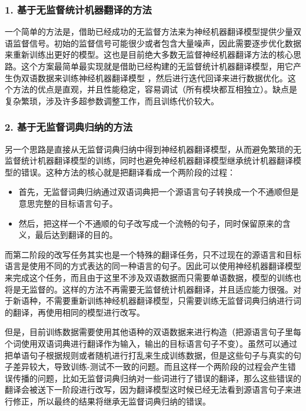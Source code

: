 \subsubsection{1. 基于无监督统计机器翻译的方法}

\parinterval 一个简单的方法是，借助已经成功的无监督方法来为神经机器翻译模型提供少量双语监督信号。初始的监督信号可能很少或者包含大量噪声，因此需要逐步优化数据来重新训练出更好的模型。这也是目前绝大多数无监督神经机器翻译方法的核心思路。这个方案最简单最实现就是借助已经构建的无监督统计机器翻译模型，用它产生伪双语数据来训练神经机器翻译模型 ，然后进行迭代回译来进行数据优化。这个方法的优点是直观，并且性能稳定，容易调试（所有模块都互相独立）。缺点是复杂繁琐，涉及许多超参数调整工作，而且训练代价较大。

\subsubsection{2. 基于无监督词典归纳的方法}

\parinterval 另一个思路是直接从无监督词典归纳中得到神经机器翻译模型，从而避免繁琐的无监督统计机器翻译模型的训练，同时也避免神经机器翻译模型继承统计机器翻译模型的错误。这种方法的核心就是把翻译看成一个两阶段的过程：

\begin{itemize}
\vspace{0.5em}
\item 首先，无监督词典归纳通过双语词典把一个源语言句子转换成一个不通顺但是意思完整的目标语言句子。
\vspace{0.5em}
\item 然后，把这样一个不通顺的句子改写成一个流畅的句子，同时保留原来的含义，最后达到翻译的目的。
\vspace{0.5em}
\end{itemize}

\parinterval 而第二阶段的改写任务其实也是一个特殊的翻译任务，只不过现在的源语言和目标语言是使用不同的方式表达的同一种语言的句子。因此可以使用神经机器翻译模型来完成这个任务，而且由于这里不涉及双语数据而只需要单语数据，模型的训练也将是无监督的。这样的方法不再需要无监督统计机器翻译，并且适应能力很强。对于新语种，不需要重新训练神经机器翻译模型，只需要训练无监督词典归纳进行词的翻译，再使用相同的模型进行改写。

\parinterval 但是，目前训练数据需要使用其他语种的双语数据来进行构造（把源语言句子里每个词使用双语词典进行翻译作为输入，输出的目标语言句子不变）。虽然可以通过把单语句子根据规则或者随机进行打乱来生成训练数据，但是这些句子与真实的句子差异较大，导致训练-测试不一致的问题。而且这样一个两阶段的过程会产生错误传播的问题，比如无监督词典归纳对一些词进行了错误的翻译，那么这些错误的翻译会被送下一阶段进行改写，因为翻译模型这时候已经无法看到源语言句子来进行修正，所以最终的结果将继承无监督词典归纳的错误。

